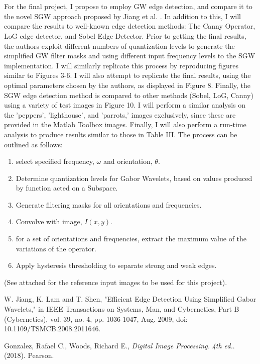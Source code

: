 \documentclass[./abstract_proposal.tex]{subfiles}
\begin{document}
\\ \\
\noindent For the final project, I propose to employ GW edge detection, and compare it to the novel SGW approach proposed by Jiang et al. \cite{main_paper}.  In addition to this, I will compare the results to well-known edge detection methods: The Canny Operator, LoG edge detector, and Sobel Edge Detector. Prior to getting the final results, the authors exploit different numbers of quantization levels to generate the simplified GW filter masks and using different input frequency levels to the SGW implementation.  I will similarly replicate this process by reproducing figures similar to Figures 3-6.  I will also attempt to replicate the final results, using the optimal parameters chosen by the authors, as displayed in Figure 8.  Finally, the SGW edge detection method is compared to other methods (Sobel, LoG, Canny) using a variety of test images in Figure 10.  I will perform a similar analysis on the 'peppers', 'lighthouse', and 'parrots,' images exclusively, since these are provided in the Matlab Toolbox images.  Finally, I will also perform a run-time analysis to produce results similar to those in Table III.  The process can be outlined as follows:



\begin{enumerate}
\item select specified frequency, $\omega$ and orientation, $\theta$.  
\item Determine quantization levels for Gabor Wavelets, based on values produced by function acted on a Subspace.
\item Generate filtering masks for all orientations and frequencies.
\item Convolve with image, $I(x,y).$
\item for a set of orientations and frequencies, extract the maximum value of the variations of the operator.
\item Apply hysteresis thresholding to separate strong and weak edges.
\end{enumerate}

(See attached for the reference input images to be used for this project). 

\clearpage

\begin{thebibliography}{9}
W. Jiang, K. Lam and T. Shen, "Efficient Edge Detection Using Simplified Gabor Wavelets," in IEEE Transactions on Systems, Man, and Cybernetics, Part B (Cybernetics), vol. 39, no. 4, pp. 1036-1047, Aug. 2009, doi: 10.1109/TSMCB.2008.2011646.

Gonzalez, Rafael C., Woods, Richard E., \textit{Digital Image Processing.} \textit{4th ed.}. (2018). Pearson.  
\end{thebibliography}
\end{document}
